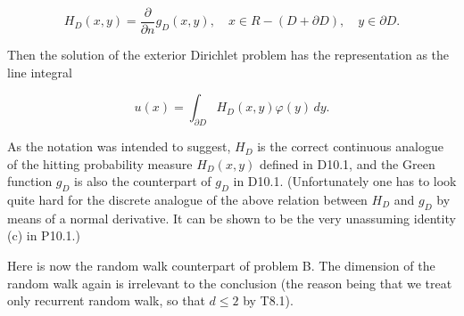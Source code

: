 $$H_D(x,y) = \frac{\partial}{\partial n} g_D(x,y), \quad x \in R - (D + \partial D), \quad y \in \partial D.$$

Then the solution of the exterior Dirichlet problem has the representation as the line integral

$$u(x) = \int_{\partial D} H_D(x,y)\varphi(y) \, dy.$$

As the notation was intended to suggest, $H_D$ is the correct continuous analogue of the hitting probability measure $H_D(x,y)$ defined in D10.1, and the Green function $g_D$ is also the counterpart of $g_D$ in D10.1. (Unfortunately one has to look quite hard for the discrete analogue of the above relation between $H_D$ and $g_D$ by means of a normal derivative. It can be shown to be the very unassuming identity (c) in P10.1.)

Here is now the random walk counterpart of problem B. The dimension of the random walk again is irrelevant to the conclusion (the reason being that we treat only recurrent random walk, so that $d \leq 2$ by T8.1).